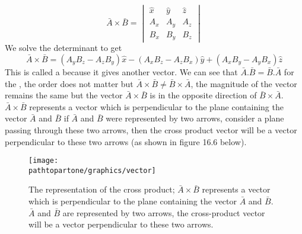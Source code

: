 \begin{dmath*}
\bar{A} \times \bar{B} = 
\begin{vmatrix}
\hat{x} & \hat{y} & \hat{z}\\
A_{x} & A_{y} & A_{z} \\
B_{x} & B_{y} & B_{z} 
\end{vmatrix}
\end{dmath*}
We solve the determinant to get 
\begin{dmath}
\bar{A} \times \bar{B} = (A_{y}B_{z} - A_{z}B_{y})\hat{x} - (A_{x}B_{z} - A_{z}B_{x})\hat{y} + (A_{x}B_{y} - A_{y}B_{x})\hat{z}
\end{dmath}
This is called a  because it gives another vector. We can see that $\bar{A}.\bar{B} = \bar{B}.\bar{A} $ for the , the order does not matter but $\bar{A} \times \bar{B} \neq \bar{B} \times \bar{A}$, the magnitude of the vector remains the same but the vector $\bar{A} \times \bar{B}$ is in the opposite direction of $\bar{B} \times \bar{A}$. $\bar{A} \times \bar{B}$ represents a vector which is perpendicular to the plane containing the vector $\bar{A}$ and $\bar{B}$ if $\bar{A}$ and $\bar{B}$ were represented by two arrows, consider a plane passing through these two arrows, then the cross product vector will be a vector perpendicular to these two arrows (as shown in figure 16.6 below).

\begin{figure}[h]
\centering
\texttt{[image: \\pathtopartone/graphics/vector]}
\caption{The representation of the cross product; $\bar{A} \times \bar{B}$ represents a vector which is perpendicular to the plane containing the vector $\bar{A}$ and $\bar{B}$. $\bar{A}$ and $\bar{B}$ are represented by two arrows, the cross-product vector will be a vector perpendicular to these two arrows.}
\end{figure}

